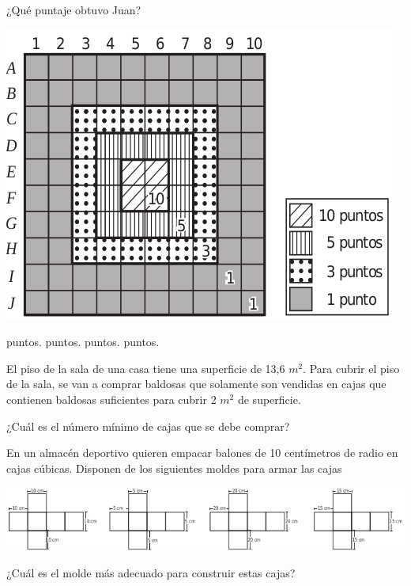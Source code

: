 \documentclass[10pt,letterpaper,addpoints]{exam}
\begin{document}
\begin{questions}
\begin{minipage}{.35\textwidth}
¿Qué puntaje obtuvo Juan?
\end{minipage}\hfill
\begin{minipage}{.65\textwidth}
\begin{center}
\includegraphics[scale=.50]{Images/juego_dados.png} 
\end{center}
\end{minipage}

\begin{oneparchoices}
 puntos.
 puntos.
 puntos.
 puntos.
\end{oneparchoices}
\question El piso de la sala de una casa tiene una superficie de 13,6 $m^{2}$. Para cubrir el piso de la sala, se van a comprar baldosas que solamente son vendidas en cajas que contienen baldosas suficientes para cubrir 2 $m^2$ de superficie.

¿Cuál es el número mínimo de cajas que se debe comprar?

\begin{oneparchoices}
\end{oneparchoices}
\question En un almacén deportivo quieren empacar balones de 10 centímetros de radio en cajas cúbicas. Disponen de los siguientes moldes para armar las cajas
\begin{center}
\includegraphics[scale=.75]{Images/moldes.png} 
\end{center}
¿Cuál es el molde más adecuado para construir estas cajas?


\end{questions}
\end{document}
